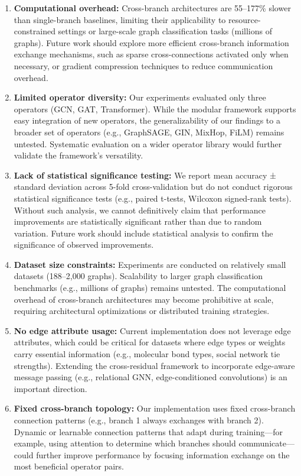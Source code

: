 \begin{enumerate}
    \item \textbf{Computational overhead:} Cross-branch architectures are 55--177\% slower than single-branch baselines, limiting their applicability to resource-constrained settings or large-scale graph classification tasks (millions of graphs). Future work should explore more efficient cross-branch information exchange mechanisms, such as sparse cross-connections activated only when necessary, or gradient compression techniques to reduce communication overhead.

    \item \textbf{Limited operator diversity:} Our experiments evaluated only three operators (GCN, GAT, Transformer). While the modular framework supports easy integration of new operators, the generalizability of our findings to a broader set of operators (e.g., GraphSAGE, GIN, MixHop, FiLM) remains untested. Systematic evaluation on a wider operator library would further validate the framework's versatility.

    \item \textbf{Lack of statistical significance testing:} We report mean accuracy ± standard deviation across 5-fold cross-validation but do not conduct rigorous statistical significance tests (e.g., paired t-tests, Wilcoxon signed-rank tests). Without such analysis, we cannot definitively claim that performance improvements are statistically significant rather than due to random variation. Future work should include statistical analysis to confirm the significance of observed improvements.

    \item \textbf{Dataset size constraints:} Experiments are conducted on relatively small datasets (188--2,000 graphs). Scalability to larger graph classification benchmarks (e.g., millions of graphs) remains untested. The computational overhead of cross-branch architectures may become prohibitive at scale, requiring architectural optimizations or distributed training strategies.

    \item \textbf{No edge attribute usage:} Current implementation does not leverage edge attributes, which could be critical for datasets where edge types or weights carry essential information (e.g., molecular bond types, social network tie strengths). Extending the cross-residual framework to incorporate edge-aware message passing (e.g., relational GNN, edge-conditioned convolutions) is an important direction.

    \item \textbf{Fixed cross-branch topology:} Our implementation uses fixed cross-branch connection patterns (e.g., branch 1 always exchanges with branch 2). Dynamic or learnable connection patterns that adapt during training---for example, using attention to determine which branches should communicate---could further improve performance by focusing information exchange on the most beneficial operator pairs.
\end{enumerate}

